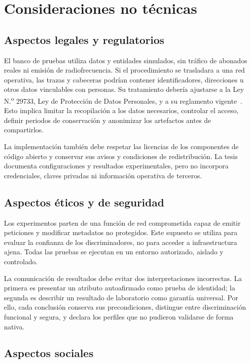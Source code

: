 \section{Consideraciones no técnicas}
\label{sec:consideraciones-cap1}

\subsection{Aspectos legales y regulatorios}

El banco de pruebas utiliza datos y entidades simulados, sin tráfico de abonados reales ni emisión de radiofrecuencia. Si el procedimiento se trasladara a una red operativa, las trazas y cabeceras podrían contener identificadores, direcciones u otros datos vinculables con personas. Su tratamiento debería ajustarse a la Ley N.\textsuperscript{o} 29733, Ley de Protección de Datos Personales, y a su reglamento vigente~\cite{PeruLey29733,PeruDS0162024JUS}. Esto implica limitar la recopilación a los datos necesarios, controlar el acceso, definir periodos de conservación y anonimizar los artefactos antes de compartirlos.

La implementación también debe respetar las licencias de los componentes de código abierto y conservar sus avisos y condiciones de redistribución. La tesis documenta configuraciones y resultados experimentales, pero no incorpora credenciales, claves privadas ni información operativa de terceros.

\subsection{Aspectos éticos y de seguridad}

Los experimentos parten de una función de red comprometida capaz de emitir peticiones y modificar metadatos no protegidos. Este supuesto se utiliza para evaluar la confianza de los discriminadores, no para acceder a infraestructura ajena. Todas las pruebas se ejecutan en un entorno autorizado, aislado y controlado.

La comunicación de resultados debe evitar dos interpretaciones incorrectas. La primera es presentar un atributo autoafirmado como prueba de identidad; la segunda es describir un resultado de laboratorio como garantía universal. Por ello, cada conclusión conserva sus precondiciones, distingue entre discriminación funcional y segura, y declara los perfiles que no pudieron validarse de forma nativa.

\subsection{Aspectos sociales}

